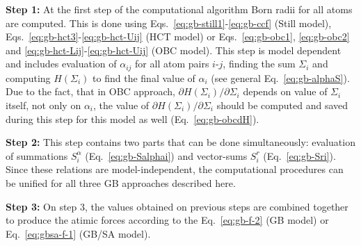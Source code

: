 \documentclass[11pt]{book}
\begin{document}
{\bf Step 1:} At the first step of the computational algorithm Born radii for all atoms are computed. This is done using Eqs.~\ref{eq:gb-still1}-\ref{eq:gb-ccf} (Still model), Eqs.~\ref{eq:gb-hct3}-\ref{eq:gb-hct-Uij} (HCT model) or Eqs.~\ref{eq:gb-obc1}, \ref{eq:gb-obc2} and \ref{eq:gb-hct-Lij}-\ref{eq:gb-hct-Uij} (OBC model). This step is model dependent and includes evaluation of $\alpha_{ij}$ for all atom pairs $i$-$j$, finding the sum $\Sigma_{i}$ and computing $H(\Sigma_{i})$ to find the final value of $\alpha_{i}$ (see general Eq.~\ref{eq:gb-alphaS}). Due to the fact, that in OBC approach, $\partial H(\Sigma_{i})/\partial \Sigma_{i}$ depends on value of $\Sigma_{i}$ itself, not only on $\alpha_{i}$, the value of $\partial H(\Sigma_{i})/\partial \Sigma_{i}$ should be computed and saved during this step for this model as well (Eq.~\ref{eq:gb-obcdH}).

{\bf Step 2:} This step contains two parts that can be done simultaneously: evaluation of summations $S^{\alpha}_{i}$ (Eq.~\ref{eq:gb-Salphai}) and vector-sums $S^{r}_{i}$ (Eq.~\ref{eq:gb-Sri}). Since these relations are model-independent, the computational procedures can be unified for all three GB approaches described here.

{\bf Step 3:} On step 3, the values obtained on previous steps are combined together to produce the atimic forces according to the Eq.~\ref{eq:gb-f-2} (GB model) or Eq.~\ref{eq:gbsa-f-1} (GB/SA model).

\end{document}
